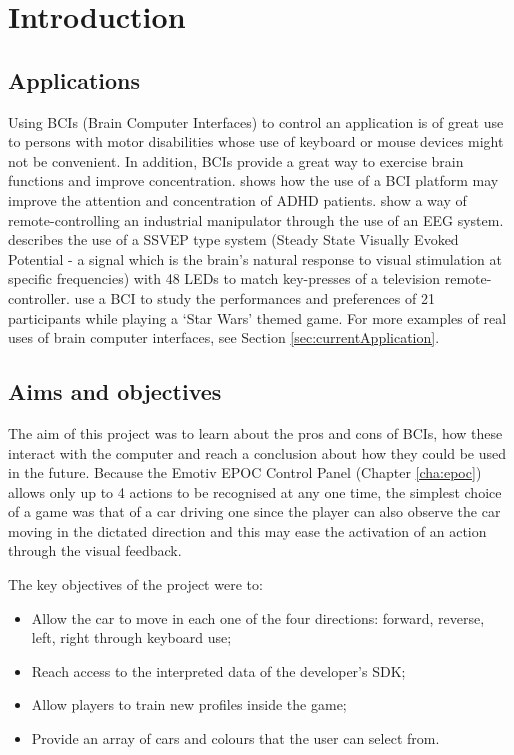\chapter{Introduction}
\label{cha:intro}

\section{Applications}

Using BCIs (Brain Computer Interfaces) to control an application is of great use to persons with motor disabilities whose use of keyboard or mouse devices might not be convenient. In addition,  BCIs provide a great way to exercise brain functions and improve concentration. \cite{adhd} shows how the use of a BCI platform may improve the attention and concentration of ADHD patients. \cite{manipulator} show a way of remote-controlling an industrial manipulator through the use of an EEG system. \cite{remotecontroller} describes the use of a SSVEP type system (Steady State Visually Evoked Potential - a signal which is the brain's natural response to visual stimulation at specific frequencies) with 48 LEDs to match key-presses of a television remote-controller. \cite{exhibition} use a BCI to study the performances and preferences of 21 participants while playing a `Star Wars' themed game. For more examples of real uses of brain computer interfaces, see Section \ref{sec:currentApplication}.

\section{Aims and objectives}

The aim of this project was to learn about the pros and cons of BCIs, how these interact with the computer and reach a conclusion about how they could be used in the future. Because the Emotiv EPOC Control Panel (Chapter \ref{cha:epoc}) allows only up to 4 actions to be recognised at any one time, the simplest choice of a game was that of a car driving one since the player can also observe the car moving in the dictated direction and this may ease the activation of an action through the visual feedback.

The key objectives of the project were to:
\begin{itemize}
	\item Allow the car to move in each one of the four directions: forward, reverse, left, right through keyboard use; 
	\item Reach access to the interpreted data of the developer's SDK;
	\item Allow players to train new profiles inside the game;
	\item Provide an array of cars and colours that the user can select from.
\end{itemize}

